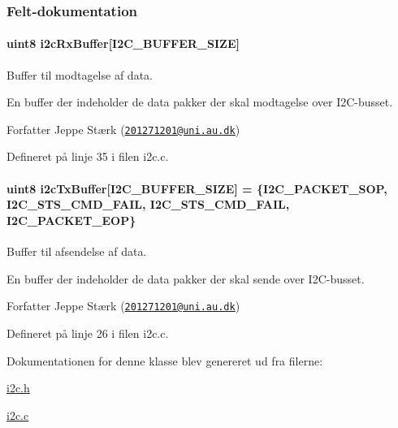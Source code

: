 \subsubsection{Felt-\/dokumentation}
\paragraph[{\texorpdfstring{i2c\+Rx\+Buffer}{i2cRxBuffer}}]{\setlength{\rightskip}{0pt plus 5cm}uint8 i2c\+Rx\+Buffer\mbox{[}{\bf I2\+C\+\_\+\+B\+U\+F\+F\+E\+R\+\_\+\+S\+I\+ZE}\mbox{]}\hspace{0.3cm}{\ttfamily [private]}}\hypertarget{class_i2_c_a88d6ebcf1ef5f528b63cf306ad1a5909}{}\label{class_i2_c_a88d6ebcf1ef5f528b63cf306ad1a5909}


Buffer til modtagelse af data. 

En buffer der indeholder de data pakker der skal modtagelse over I2\+C-\/busset.

\begin{DoxyAuthor}{Forfatter}
Jeppe Stærk (\href{mailto:201271201@uni.au.dk}{\tt 201271201@uni.\+au.\+dk}) 
\end{DoxyAuthor}


Defineret på linje 35 i filen i2c.\+c.

\paragraph[{\texorpdfstring{i2c\+Tx\+Buffer}{i2cTxBuffer}}]{\setlength{\rightskip}{0pt plus 5cm}uint8 i2c\+Tx\+Buffer\mbox{[}{\bf I2\+C\+\_\+\+B\+U\+F\+F\+E\+R\+\_\+\+S\+I\+ZE}\mbox{]} = \{{\bf I2\+C\+\_\+\+P\+A\+C\+K\+E\+T\+\_\+\+S\+OP}, {\bf I2\+C\+\_\+\+S\+T\+S\+\_\+\+C\+M\+D\+\_\+\+F\+A\+IL}, {\bf I2\+C\+\_\+\+S\+T\+S\+\_\+\+C\+M\+D\+\_\+\+F\+A\+IL}, {\bf I2\+C\+\_\+\+P\+A\+C\+K\+E\+T\+\_\+\+E\+OP}\}\hspace{0.3cm}{\ttfamily [private]}}\hypertarget{class_i2_c_af66ed5dc7817e74d7da731c994721217}{}\label{class_i2_c_af66ed5dc7817e74d7da731c994721217}


Buffer til afsendelse af data. 

En buffer der indeholder de data pakker der skal sende over I2\+C-\/busset.

\begin{DoxyAuthor}{Forfatter}
Jeppe Stærk (\href{mailto:201271201@uni.au.dk}{\tt 201271201@uni.\+au.\+dk}) 
\end{DoxyAuthor}


Defineret på linje 26 i filen i2c.\+c.



Dokumentationen for denne klasse blev genereret ud fra filerne\+:\begin{DoxyCompactItemize}
\item 
\hyperlink{i2c_8h}{i2c.\+h}\item 
\hyperlink{i2c_8c}{i2c.\+c}\end{DoxyCompactItemize}
